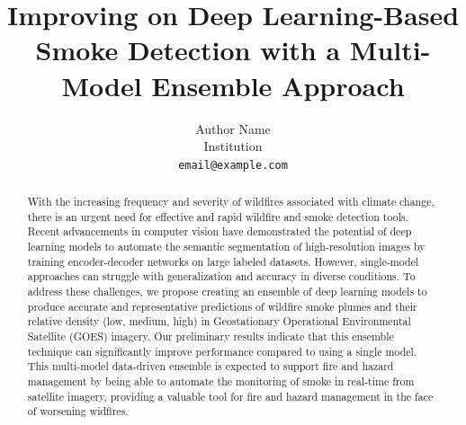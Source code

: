 \documentclass{article}
\title{Improving on Deep Learning-Based Smoke Detection with a Multi-Model Ensemble Approach
}
\author{Author Name \\
Institution \\
\texttt{email@example.com}
}
\begin{document}
\maketitle


\begin{abstract}
With the increasing frequency and severity of wildfires associated with climate change, there is an urgent need for effective and rapid wildfire and smoke detection tools. Recent advancements in computer vision have demonstrated the potential of deep learning models to automate the semantic segmentation of high-resolution images by training encoder-decoder networks on large labeled datasets. However, single-model approaches can struggle with generalization and accuracy in diverse conditions. To address these challenges, we propose creating an ensemble of deep learning models to produce accurate and representative predictions of wildfire smoke plumes and their relative density (low, medium, high) in Geostationary Operational Environmental Satellite (GOES) imagery. Our preliminary results indicate that this ensemble technique can significantly improve performance compared to using a single model. This multi-model data-driven ensemble is expected to support fire and hazard management by being able to automate the monitoring of smoke in real-time from satellite imagery, providing a valuable tool for fire and hazard management in the face of worsening widfires.
\end{abstract}
\end{document}
